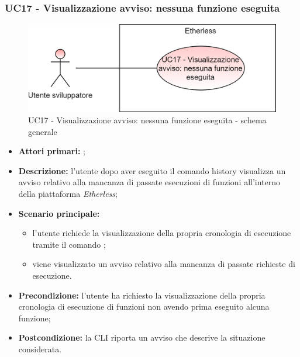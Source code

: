 \subsubsection{UC17 - Visualizzazione avviso: nessuna funzione eseguita}
\begin{figure}[h]
	\centering
	\includegraphics[scale=\ucs]{./res/img/UC17G.png}
	\caption {UC17 - Visualizzazione avviso: nessuna funzione eseguita - schema generale}
\end{figure}
\begin{itemize}
	\item \textbf{Attori primari:} \us{};
	\item \textbf{Descrizione:} l’utente dopo aver eseguito il comando history visualizza un avviso relativo alla mancanza di passate esecuzioni di funzioni all’interno della piattaforma \textit{Etherless};
	\item \textbf{Scenario principale:} 
	\begin{itemize}
		\item l’utente richiede la visualizzazione della propria cronologia di esecuzione tramite il comando \history{};
		\item viene visualizzato un avviso relativo alla mancanza di passate richieste di esecuzione.
	\end{itemize}
	\item \textbf{Precondizione:}  l’utente ha richiesto la visualizzazione della propria cronologia di esecuzione di funzioni non avendo prima eseguito alcuna funzione;
	\item \textbf{Postcondizione:} la CLI riporta un avviso che descrive la situazione considerata.  
\end{itemize}